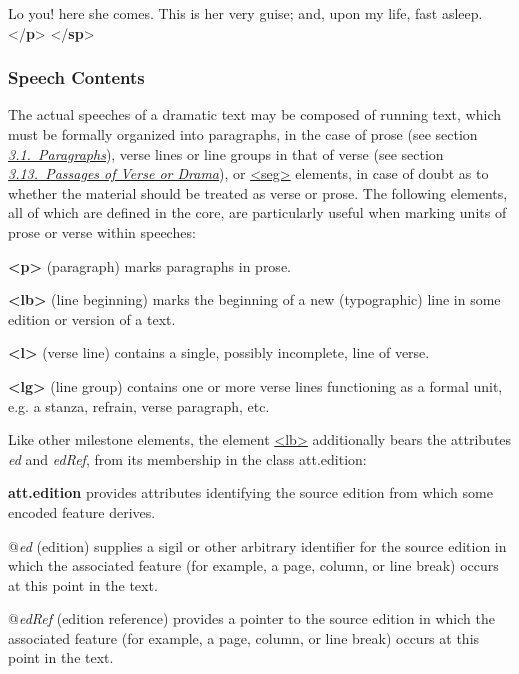 \begin{shaded}
\hspace*{1em}\hspace*{1em} Lo you! here she comes. This is her very guise; and,\mbox{}\newline 
\hspace*{1em}\hspace*{1em} upon my life, fast asleep.{</\textbf{p}>}\mbox{}\newline 
{</\textbf{sp}>}\end{shaded}\egroup\par 
\subsubsection[{Speech Contents}]{Speech Contents}\label{DRPAL}\par
The actual speeches of a dramatic text may be composed of running text, which must be formally organized into paragraphs, in the case of prose (see section \textit{\hyperref[COPA]{3.1.\ Paragraphs}}), verse lines or line groups in that of verse (see section \textit{\hyperref[CODV]{3.13.\ Passages of Verse or Drama}}), or \hyperref[TEI.seg]{<seg>} elements, in case of doubt as to whether the material should be treated as verse or prose. The following elements, all of which are defined in the core, are particularly useful when marking units of prose or verse within speeches: 
\begin{sansreflist}
  
\item [\textbf{<p>}] (paragraph) marks paragraphs in prose.
\item [\textbf{<lb>}] (line beginning) marks the beginning of a new (typographic) line in some edition or version of a text.
\item [\textbf{<l>}] (verse line) contains a single, possibly incomplete, line of verse.
\item [\textbf{<lg>}] (line group) contains one or more verse lines functioning as a formal unit, e.g. a stanza, refrain, verse paragraph, etc.
\end{sansreflist}
\par
Like other milestone elements, the element \hyperref[TEI.lb]{<lb>} additionally bears the attributes {\itshape ed} and {\itshape edRef}, from its membership in the class \textsf{att.edition}: 
\begin{sansreflist}
  
\item [\textbf{att.edition}] provides attributes identifying the source edition from which some encoded feature derives.\hfil\\[-10pt]\begin{sansreflist}
    \item[@{\itshape ed}]
  (edition) supplies a sigil or other arbitrary identifier for the source edition in which the associated feature (for example, a page, column, or line break) occurs at this point in the text.
    \item[@{\itshape edRef}]
  (edition reference) provides a pointer to the source edition in which the associated feature (for example, a page, column, or line break) occurs at this point in the text.
\end{sansreflist}  
\end{sansreflist}
